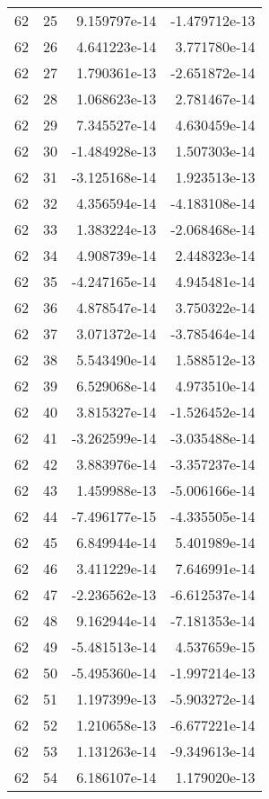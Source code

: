 \begin{tabular}{rrrr}
  62 &   25 &  9.159797e-14 & -1.479712e-13 \\
  62 &   26 &  4.641223e-14 &  3.771780e-14 \\
  62 &   27 &  1.790361e-13 & -2.651872e-14 \\
  62 &   28 &  1.068623e-13 &  2.781467e-14 \\
  62 &   29 &  7.345527e-14 &  4.630459e-14 \\
  62 &   30 & -1.484928e-13 &  1.507303e-14 \\
  62 &   31 & -3.125168e-14 &  1.923513e-13 \\
  62 &   32 &  4.356594e-14 & -4.183108e-14 \\
  62 &   33 &  1.383224e-13 & -2.068468e-14 \\
  62 &   34 &  4.908739e-14 &  2.448323e-14 \\
  62 &   35 & -4.247165e-14 &  4.945481e-14 \\
  62 &   36 &  4.878547e-14 &  3.750322e-14 \\
  62 &   37 &  3.071372e-14 & -3.785464e-14 \\
  62 &   38 &  5.543490e-14 &  1.588512e-13 \\
  62 &   39 &  6.529068e-14 &  4.973510e-14 \\
  62 &   40 &  3.815327e-14 & -1.526452e-14 \\
  62 &   41 & -3.262599e-14 & -3.035488e-14 \\
  62 &   42 &  3.883976e-14 & -3.357237e-14 \\
  62 &   43 &  1.459988e-13 & -5.006166e-14 \\
  62 &   44 & -7.496177e-15 & -4.335505e-14 \\
  62 &   45 &  6.849944e-14 &  5.401989e-14 \\
  62 &   46 &  3.411229e-14 &  7.646991e-14 \\
  62 &   47 & -2.236562e-13 & -6.612537e-14 \\
  62 &   48 &  9.162944e-14 & -7.181353e-14 \\
  62 &   49 & -5.481513e-14 &  4.537659e-15 \\
  62 &   50 & -5.495360e-14 & -1.997214e-13 \\
  62 &   51 &  1.197399e-13 & -5.903272e-14 \\
  62 &   52 &  1.210658e-13 & -6.677221e-14 \\
  62 &   53 &  1.131263e-14 & -9.349613e-14 \\
  62 &   54 &  6.186107e-14 &  1.179020e-13 \\

\end{tabular}
